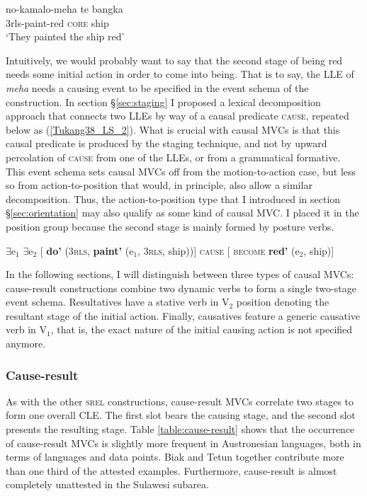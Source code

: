 \ea \label{Tukang38_2}
\gll no-kamalo-meha te bangka \\
3\acs{rls}-paint-red \textsc{core} ship \\
\glft `They painted the ship red' \\ 
\z
\xe

Intuitively, we would probably want to say that the second stage of being red needs some initial action in order to come into being. That is to say, the LLE of \textit{meha} needs a causing event to be specified in the event schema of the construction. In section §\ref{sec:staging} I proposed a lexical decomposition approach that connects two LLEs by way of a causal predicate \textsc{cause}, repeated below as (\ref{Tukang38_LS_2}). What is crucial with causal MVCs is that this causal predicate is produced by the staging technique, and not by upward percolation of \textsc{cause} from one of the LLEs, or from a grammatical formative. This event schema sets causal MVCs off from the motion-to-action case, but less so from action-to-position that would, in principle, also allow a similar decomposition. Thus, the action-to-position type that I introduced in section §\ref{sec:orientation} may also qualify as some kind of causal MVC. I placed it in the position group because the second stage is mainly formed by posture verbs.

\ex 
\label{Tukang38_LS_2} $\exists$e$_1$ $\exists$e$_2$ [ \textbf{do'} (3\textsc{rls}, \textbf{paint'} (e$_1$, 3\textsc{rls}, ship))] \textsc{cause} [ \textsc{become} \textbf{red'} (e$_2$, ship)]
\xe

In the following sections, I will distinguish between three types of causal MVCs: cause-result constructions combine two dynamic verbs to form a single two-stage event schema. Resultatives have a stative verb in V$_2$ position denoting the resultant stage of the initial action. Finally, causatives feature a generic causative verb in V$_1$, that is, the exact nature of the initial causing action is not specified anymore.

\subsubsection{Cause-result} \label{sec:cause-result}

As with the other \textsc{srel} constructions, cause-result MVCs correlate two stages to form one overall CLE. The first slot bears the causing stage, and the second slot presents the resulting stage. Table \ref{table:cause-result} shows that the occurrence of cause-result MVCs is slightly more frequent in Austronesian languages, both in terms of languages and data points. Biak and Tetun together contribute more than one third of the attested examples. Furthermore, cause-result is almost completely unattested in the Sulawesi subarea. 

